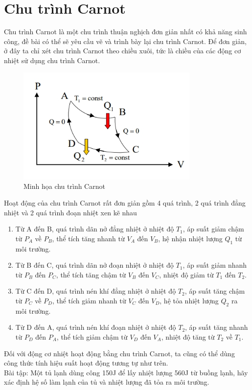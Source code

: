 \section{Chu trình Carnot}
Chu trình Carnot là một chu trình thuận nghịch đơn giản nhất có khả năng sinh công, đề bài có thể sẽ yêu cầu vẽ và trình bày lại chu trình Carnot. Để đơn giản, ở đây ta chỉ xét chu trình Carnot theo chiều xuôi, tức là chiều của các động cơ nhiệt sử dụng chu trình Carnot.
\begin{figure}
    \centering
    \includegraphics[width=0.8\textwidth]{carnot.png}
    \caption{Minh họa chu trình Carnot}
    \label{carnot}
\end{figure}
Hoạt động của chu trình Carnot rất đơn giản gồm 4 quá trình, 2 quá trình đẳng nhiệt và 2 quá trình đoạn nhiệt xen kẽ nhau
\begin{enumerate}
    \item Từ A đến B, quá trình dãn nở đẳng nhiệt ở nhiệt độ $T_{1}$, áp suất giảm chậm từ $P_{A}$ về $P_{B}$, thể tích tăng nhanh từ $V_{A}$ đến $V_{B}$, hệ nhận nhiệt lượng $Q_{1}$ từ môi trường.
    \item Từ B đến C, quá trình dãn nở đoạn nhiệt ở nhiệt độ $T_{1}$, áp suất giảm nhanh từ $P_{B}$ đến $P_{C}$, thể tích tăng chậm từ $V_{B}$ đến $V_{C}$, nhiệt độ giảm từ $T_{1}$ đến $T_{2}$.
    \item Từ C đến D, quá trình nén khí đẳng nhiệt ở nhiệt độ $T_{2}$, áp suất tăng chậm từ $P_{C}$ về $P_{D}$, thể tích giảm nhanh từ $V_{C}$ đến $V_{D}$, hệ tỏa nhiệt lượng $Q_{2}$ ra môi trường.
    \item Từ D đến A, quá trình nén khí đoạn nhiệt ở nhiệt độ $T_{2}$, áp suất tăng nhanh từ $P_{D}$ đến $P_{A}$, thể tích giảm chậm từ $V_{D}$ đến $V_{A}$, nhiệt độ tăng từ $T_{2}$ về $T_{1}$.
\end{enumerate}
Đối với động cơ nhiệt hoạt động bằng chu trình Carnot, ta cũng có thể dùng công thức tính hiệu suất hoạt động tương tự như trên.
\\Bài tập: Một tủ lạnh dùng công 150J để lấy nhiệt lượng 560J từ buồng lạnh, hãy xác định hệ số làm lạnh của tủ và nhiệt lượng đã tỏa ra môi trường.